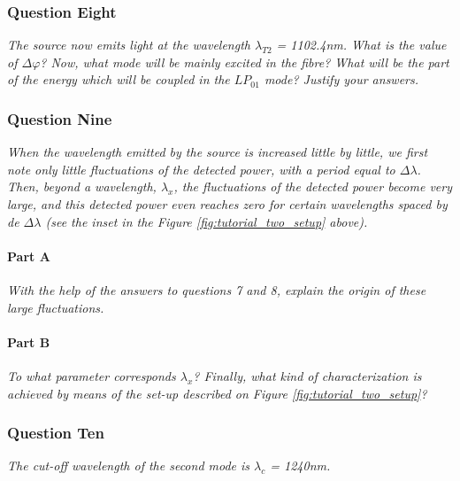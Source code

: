 \documentclass[colorlinks,11pt,a4paper,normalphoto,withhyper,ragged2e]{altareport}
\begin{document}
\subsubsection{Question Eight}
\textit{The source now emits light at the wavelength $\lambda_{T2}$ = 1102.4nm. What is the value of $\Delta\varphi$? Now, what mode will be mainly excited in the fibre? What will be the part of the energy which will be coupled in the $LP_{01}$ mode? Justify your answers.} \linebreak




\subsubsection{Question Nine}
\textit{When the wavelength emitted by the source is increased little by little, we first note only little fluctuations of the detected power, with a period equal to $\Delta\lambda$. Then, beyond a wavelength, $\lambda_x$, the fluctuations of the detected power become very large, and this detected power even reaches zero for certain wavelengths spaced by de $\Delta\lambda$ (see the inset in the Figure \ref{fig:tutorial_two_setup} above).} \linebreak


\paragraph{Part A \linebreak}
\textit{With the help of the answers to questions 7 and 8, explain the origin of these large fluctuations.} \linebreak




\paragraph{Part B \linebreak}
\textit{To what parameter corresponds $\lambda_x$? Finally, what kind of characterization is achieved by means of the set-up described on Figure \ref{fig:tutorial_two_setup}?} \linebreak




\subsubsection{Question Ten}
\textit{The cut-off wavelength of the second mode is $\lambda_c$ = 1240nm.} \linebreak
\end{document}
